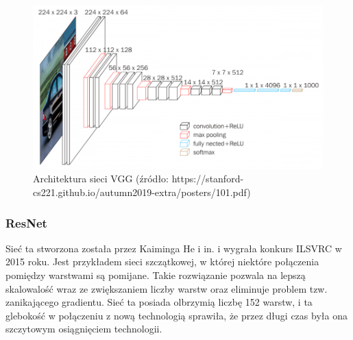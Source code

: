 \documentclass[a4paper,twoside,12pt]{book}
\begin{document}
{\begin{figure}[h!]
\centering
\includegraphics[scale=0.4]{VGG.png}
\caption{Architektura sieci VGG (źródło: https://stanford-cs221.github.io/autumn2019-extra/posters/101.pdf)}
\label{VGG}
\end{figure}







\subsubsection{ResNet}
\label{Res}
{Sieć ta stworzona została przez Kaiminga He i in. i wygrała konkurs ILSVRC w 2015 roku\cite{he2016deep}. Jest przykładem sieci szczątkowej, w której niektóre połączenia pomiędzy warstwami są pomijane. Takie rozwiązanie pozwala na lepszą skalowalość wraz ze zwiększaniem liczby warstw oraz eliminuje problem tzw. zanikającego gradientu. Sieć ta posiada olbrzymią liczbę 152 warstw, i ta glebokość w połączeniu z nową technologią sprawiła, że przez długi czas była ona szczytowym osiągnięciem technologii.}

}
\end{document}
